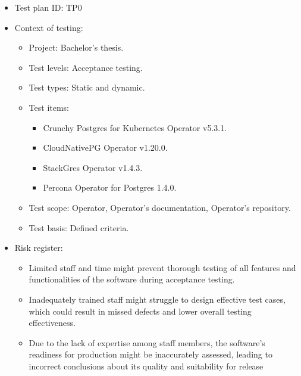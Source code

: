 
\listofappendices


\label{chap:generalTestPlan}

\begin{itemize}
    \item Test plan ID: TP0
    \item Context of testing:
          \begin{itemize}
              \item Project: Bachelor’s thesis.
              \item Test levels: Acceptance testing.
              \item Test types: Static and dynamic.
              \item Test items:
                    \begin{itemize}
                        \item Crunchy Postgres for Kubernetes Operator v5.3.1.
                        \item CloudNativePG Operator v1.20.0.
                        \item StackGres Operator v1.4.3.
                        \item Percona Operator for Postgres 1.4.0.
                    \end{itemize}
              \item Test scope: Operator, Operator’s documentation, Operator’s repository.
              \item Test basis: Defined criteria.
          \end{itemize}
    \item Risk register:
          \begin{itemize}
              \item Limited staff and time might prevent thorough testing of all features and functionalities of the software during acceptance testing.
              \item Inadequately trained staff might struggle to design effective test cases, which could result in missed defects and lower overall testing effectiveness.
              \item Due to the lack of expertise among staff members, the software's readiness for production might be inaccurately assessed, leading to incorrect conclusions about its quality and suitability for release

\end{itemize}
\end{itemize}
